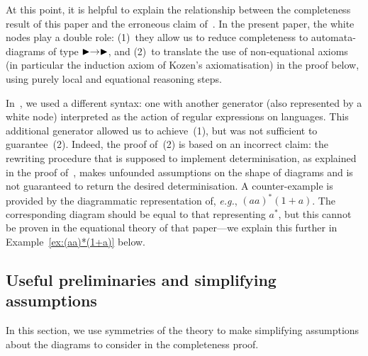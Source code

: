 \documentclass{lmcs}
\theoremstyle{plain}\newtheorem{satz}[thm]{Satz} %
\begin{document}
\begin{rem}
At this point, it is helpful to explain the relationship between the completeness result of this paper and the erroneous claim of~\cite{piedeleu2021string}. In the present paper,  the white nodes play a double role: (1)~they allow us to reduce completeness to automata-diagrams of type $\blacktriangleright \to \blacktriangleright$, and (2)~to translate the use of non-equational axioms (in particular the induction axiom of Kozen's axiomatisation) in the proof below, using purely local and equational reasoning steps.

In~\cite{piedeleu2021string}, we used a different syntax: one with another generator (also represented by a white node) interpreted as the action of regular expressions on languages.  This additional generator allowed us to achieve~(1), but was not sufficient to guarantee~(2). Indeed, the proof of~(2) is based on an incorrect claim: the rewriting procedure that is supposed to implement determinisation, as explained in the proof of~\cite[Lemma 4]{piedeleu2021string}, makes unfounded assumptions on the shape of diagrams and is not guaranteed to return the desired determinisation. A counter-example is provided by the diagrammatic representation of, \emph{e.g.}, $(aa)^*(1+a)$. The corresponding diagram should be equal to that representing $a^*$, but this cannot be proven in the equational theory of that paper---we explain this further in Example~\ref{ex:(aa)*(1+a)} below.
\end{rem}


\subsection{Useful preliminaries and simplifying assumptions}\label{sec:simplify}

In this section, we use symmetries of the theory to make simplifying assumptions about the diagrams to consider in the completeness proof.
\end{document}
